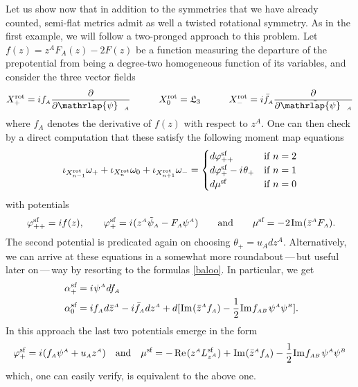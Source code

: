 \documentclass[11pt]{amsart}
\theoremstyle{remark}
\theoremstyle{remark}
\theoremstyle{definition}
\theoremstyle{definition}
\theoremstyle{definition}
\newcommand{\0}{{\scriptstyle 0'}} %
\newcommand{\1}{{\scriptstyle 1'}}
\newcommand{\A}{{\scriptscriptstyle A}} %
\newcommand{\B}{{\scriptscriptstyle B}}
\newcommand{\pt}{\hspace{1pt}} %
\newcommand{\hp}{\hspace{0.5pt}} %
\renewcommand{\Re}{\hp\mbox{Re}\pt} %
\renewcommand{\Im }{\hp\mbox{Im}\hp}
\newcommand{\psitilde}{\raisebox{0.3pt}{\smash{$\tilde{\smash{\mathrlap{\psi}} \vphantom{\rule[6.5pt]{0pt}{0pt}} \hphantom{\hspace{10.5pt}}}$}} \hspace{-4.1pt}}
\begin{document}
Let us show now that in addition to the symmetries that we have already counted, semi-flat metrics admit as well a twisted rotational symmetry. As in the first example, we will follow a two-pronged approach to this problem. Let $f(z) = z^{\A}F_{\A}(z) - 2F(z)$ be a function measuring the departure of the prepotential from being a degree-two homogeneous function of its variables, and consider the three vector fields
\begin{equation} \label{X-rot-sf}
X^{\text{rot}}_+ = i f_{\A} \frac{\partial}{\partial \psitilde_{\A}}
\quad\qquad
X^{\text{rot}}_0 = \mathfrak{L}_3
\quad\qquad
X^{\text{rot}}_- = i \bar{f}_{\A} \frac{\partial}{\partial \psitilde_{\A}}
\end{equation}
where $f_{\A}$ denotes the derivative of $f(z)$ with respect to $z^{\A}$. One can then check by a direct computation that these satisfy the following moment map equations
\begin{equation} \label{X-rot-sf-mm}
\iota_{X^{\text{rot}}_{n-1}}\omega_+ + \iota_{X^{\text{rot}}_{n}}\omega_0 + \iota_{X^{\text{rot}}_{n+1}}\omega_- =
\begin{cases}
d\varphi_{++}^{\text{sf}}  & \text{if $n = 2$} \\
d\varphi_+^{\text{sf}} - i \hp \theta_+ & \text{if $n = 1$} \\
d\mu^{\text{sf}} & \text{if $n=0$} 
\end{cases}
\end{equation}
with potentials
\begin{equation}
\varphi_{++}^{\text{sf}} = i f(z),
\quad\quad
\varphi_+^{\text{sf}} = i \hp (z^{\A}\tilde{\psi}_{\A} - F_{\A}\psi^{\A})
\qquad\text{and}\qquad
\mu^{\text{sf}} = - \hp 2 \hp \Im (\bar{z}^{\A}F_{\A}) \rlap{.}
\end{equation}
The second potential is predicated again on choosing $\theta_+ = u_{\A} dz^{\A}$. Alternatively, we can arrive at these equations in a somewhat more roundabout\,---\,but useful later on\,---\,way by resorting to the formulas \eqref{baloo}. In particular, we get
\begin{equation} \label{alphas_sf}
\begin{aligned}
\alpha_+^{\hp \text{sf}} & = i \hp \psi^{\A} \hp df_{\A}  \\
\alpha_0^{\hp \text{sf}} & = i f_{\A} \hp d\bar{z}^{\A} - i \bar{f}_{\A} \hp dz^{\A} + d [\Im(\bar{z}^{\A}f_{\A}) - \frac{1}{2} \Im f_{\A\B} \pt \psi^{\A}\psi^{\B} ] \rlap{.}
\end{aligned}
\end{equation}
In this approach the last two potentials emerge in the form
\begin{equation}
\varphi_+^{\text{sf}} = i \hp ( f_{\A} \psi^{\A} +  u_{\A}z^{\A} )
\quad\text{and}\quad
\mu^{\text{sf}} = - \pt \Re(z^{\A}L^{\text{sf}}_{z^{\A}}) + \Im(\bar{z}^{\A}f_{\A}) - \frac{1}{2} \Im f_{\A\B} \pt \psi^{\A}\psi^{\B}
\end{equation}
which, one can easily verify, is equivalent to the above one. 
\end{document}
